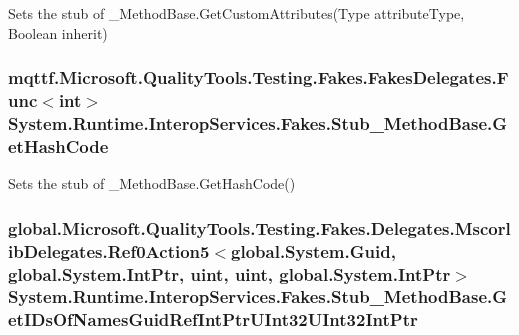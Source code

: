 Sets the stub of \-\_\-\-Method\-Base.\-Get\-Custom\-Attributes(\-Type attribute\-Type, Boolean inherit)

\hypertarget{class_system_1_1_runtime_1_1_interop_services_1_1_fakes_1_1_stub___method_base_ac5cd8ece722cfd0e06a0b8976003de00}{
\subsubsection[{Get\-Hash\-Code}]{\setlength{\rightskip}{0pt plus 5cm}mqttf.\-Microsoft.\-Quality\-Tools.\-Testing.\-Fakes.\-Fakes\-Delegates.\-Func$<$int$>$ System.\-Runtime.\-Interop\-Services.\-Fakes.\-Stub\-\_\-\-Method\-Base.\-Get\-Hash\-Code}}\label{class_system_1_1_runtime_1_1_interop_services_1_1_fakes_1_1_stub___method_base_ac5cd8ece722cfd0e06a0b8976003de00}


Sets the stub of \-\_\-\-Method\-Base.\-Get\-Hash\-Code()

\hypertarget{class_system_1_1_runtime_1_1_interop_services_1_1_fakes_1_1_stub___method_base_a24a811882fcc620ee3a5d80b4802eadd}{
\subsubsection[{Get\-I\-Ds\-Of\-Names\-Guid\-Ref\-Int\-Ptr\-U\-Int32\-U\-Int32\-Int\-Ptr}]{\setlength{\rightskip}{0pt plus 5cm}global.\-Microsoft.\-Quality\-Tools.\-Testing.\-Fakes.\-Delegates.\-Mscorlib\-Delegates.\-Ref0\-Action5$<$global.\-System.\-Guid, global.\-System.\-Int\-Ptr, uint, uint, global.\-System.\-Int\-Ptr$>$ System.\-Runtime.\-Interop\-Services.\-Fakes.\-Stub\-\_\-\-Method\-Base.\-Get\-I\-Ds\-Of\-Names\-Guid\-Ref\-Int\-Ptr\-U\-Int32\-U\-Int32\-Int\-Ptr}}\label{class_system_1_1_runtime_1_1_interop_services_1_1_fakes_1_1_stub___method_base_a24a811882fcc620ee3a5d80b4802eadd}


